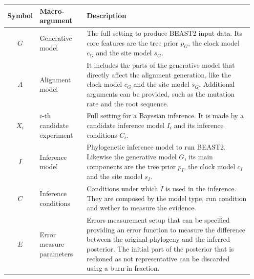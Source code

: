 \begin{table}
  \begin{tabular}{|@{}c|p{4cm}|p{12cm}|}
    \hline
    \centering
    \textbf{Symbol} &
    \textbf{Macro-argument} &
    \textbf{Description} \\
    \hline
    $\mathit{G}$ &
    Generative model &
    The full setting to produce BEAST2 input data. 
    Its core features are the tree prior $\mathit{p_{G}}$, the clock 
    model $\mathit{c_{G}}$ and the site model $\mathit{s_{G}}$. \\
    $\mathit{A}$ &
    Alignment model &
    It includes the parts of the generative model that directly affect the 
    alignment generation, like the clock model $\mathit{c_{G}}$ and 
    the site model $\mathit{s_{G}}$. Additional arguments can be provided, 
    such as the mutation rate and the root sequence. \\
    $\mathit{X_{i}}$ &
    $i$-th candidate experiment &
    Full setting for a Bayesian inference. It is made by a 
    candidate inference model $\mathit{I_{i}}$ and its 
    inference conditions $\mathit{C_{i}}$. \\
    $\mathit{I}$ &
    Inference model &
    Phylogenetic inference model to run BEAST2. Likewise the generative model $G$, 
    its main components are the tree prior $\mathit{p_{I}}$, the 
    clock model $\mathit{c_{I}}$ and the site model $\mathit{s_{I}}$. \\
    $\mathit{C}$ & Inference conditions & Conditions under which $\mathit{I}$ 
    is used in the inference. 
    They are composed by the model type, run condition and 
    wether to measure the evidence. \\
    $\mathit{E}$ & Error measure parameters & 
    Errors measurement setup that can be specified providing an 
    error function to measure the difference between the original phylogeny 
    and the inferred posterior. The initial part of the posterior that is 
    reckoned as not representative can be discarded using a burn-in fraction. \\

\end{tabular}
\end{table}

